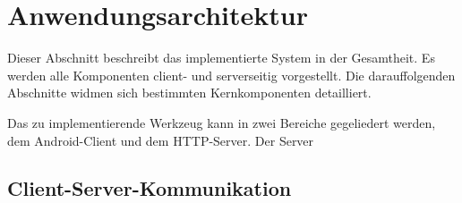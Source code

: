 \section{Anwendungsarchitektur}
\label{app_architecture}
Dieser Abschnitt beschreibt das implementierte System in der Gesamtheit. Es werden alle Komponenten client- und serverseitig vorgestellt. Die darauffolgenden Abschnitte widmen sich bestimmten Kernkomponenten detailliert. 

Das zu implementierende Werkzeug kann in zwei Bereiche gegeliedert werden, dem Android-Client und dem HTTP-Server. Der Server

\subsection{Client-Server-Kommunikation}



